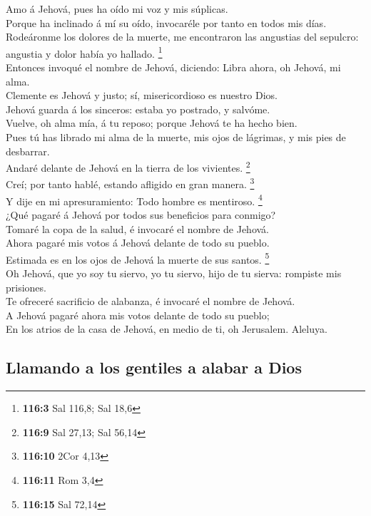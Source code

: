  Amo á Jehová, pues ha oído mi voz y mis súplicas.\\
 Porque ha inclinado á mí su oído, invocaréle por tanto en
todos mis días.\\
 Rodeáronme los dolores de la muerte, me encontraron las
angustias del sepulcro: angustia y dolor había yo hallado. \footnote{\textbf{116:3}
  Sal 116,8; Sal 18,6}\\
 Entonces invoqué el nombre de Jehová, diciendo: Libra
ahora, oh Jehová, mi alma.\\
 Clemente es Jehová y justo; sí, misericordioso es nuestro
Dios.\\
 Jehová guarda á los sinceros: estaba yo postrado, y
salvóme.\\
 Vuelve, oh alma mía, á tu reposo; porque Jehová te ha
hecho bien.\\
 Pues tú has librado mi alma de la muerte, mis ojos de
lágrimas, y mis pies de desbarrar.\\
 Andaré delante de Jehová en la tierra de los vivientes.
\footnote{\textbf{116:9} Sal 27,13; Sal 56,14}\\
 Creí; por tanto hablé, estando afligido en gran manera.
\footnote{\textbf{116:10} 2Cor 4,13}\\
 Y dije en mi apresuramiento: Todo hombre es mentiroso.
\footnote{\textbf{116:11} Rom 3,4}\\
 ¿Qué pagaré á Jehová por todos sus beneficios para
conmigo?\\
 Tomaré la copa de la salud, é invocaré el nombre de
Jehová.\\
 Ahora pagaré mis votos á Jehová delante de todo su
pueblo.\\
 Estimada es en los ojos de Jehová la muerte de sus
santos. \footnote{\textbf{116:15} Sal 72,14}\\
 Oh Jehová, que yo soy tu siervo, yo tu siervo, hijo de
tu sierva: rompiste mis prisiones.\\
 Te ofreceré sacrificio de alabanza, é invocaré el nombre
de Jehová.\\
 A Jehová pagaré ahora mis votos delante de todo su
pueblo;\\
 En los atrios de la casa de Jehová, en medio de ti, oh
Jerusalem. Aleluya.

\hypertarget{llamando-a-los-gentiles-a-alabar-a-dios}{%
\subsection{Llamando a los gentiles a alabar a
Dios}\label{llamando-a-los-gentiles-a-alabar-a-dios}}

